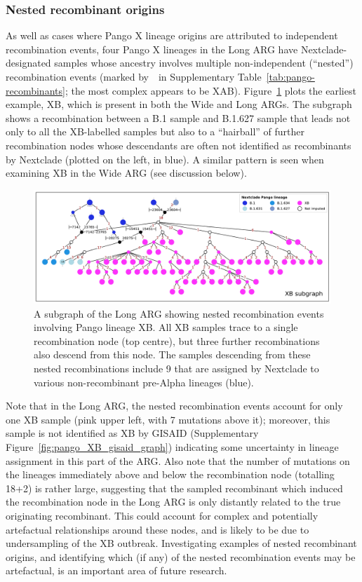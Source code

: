 \documentclass{article}
\begin{document}
\subsubsection{Nested recombinant origins}
As well as cases where Pango X lineage origins are attributed to independent
recombination events, four Pango X lineages in the Long ARG have Nextclade-designated
samples whose ancestry involves multiple non-independent (``nested'') recombination events
(marked by~\textdagger ~in Supplementary Table~\ref{tab:pango-recombinants}; the most
complex appears to be XAB). Figure~\ref{fig:complex_origins_graph} plots the earliest example,
XB,  which is present in both the Wide and Long ARGs. The subgraph shows a recombination
between a B.1 sample and B.1.627 sample that leads not only to all the XB-labelled samples
but also to a ``hairball'' of further recombination nodes whose descendants are often not
identified as recombinants by Nextclade (plotted on the left, in blue). A similar
pattern is seen when examining XB in the Wide ARG (see discussion below).

\begin{figure} \centering
\includegraphics[width=\textwidth]{figures/Pango_XB_nxcld_tight_graph.pdf}
\caption{\label{fig:complex_origins_graph}  A subgraph of the Long ARG showing
nested recombination events involving Pango lineage XB. All XB samples
trace to a single recombination node (top centre), but three further recombinations
also descend from this node. The samples descending from these nested
recombinations include 9 that are assigned by Nextclade to
various non-recombinant pre-Alpha lineages (blue).}
\end{figure}

Note that in the Long ARG, the nested recombination events account for only one
XB sample (pink upper left, with 7 mutations above it); moreover, this sample is
not identified as XB by GISAID (Supplementary Figure~\ref{fig:pango_XB_gisaid_graph})
indicating some uncertainty in lineage assignment in this part of the ARG.
Also note that the number of mutations on the lineages immediately above and
below the recombination node (totalling 18+2) is rather large, suggesting
that the sampled recombinant which induced the recombination node in the Long ARG
is only distantly related to the true originating recombinant. This could account
for complex and potentially artefactual relationships around these nodes, and
is likely to be due to undersampling of the XB outbreak. Investigating examples
of nested recombinant origins, and identifying which (if any) of the nested
recombination events may be artefactual, is an important area of future research.
\end{document}
